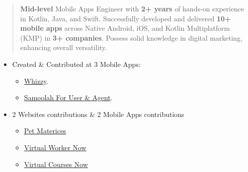 \documentclass[10pt,a4paper,ragged2e,withhyper]{altacv}
\begin{document}

    \makecvheader


    \begin{quote}

        \textbf{Mid-level} Mobile Apps Engineer with \textbf{2+ years} of hands-on experience in Kotlin, Java, and Swift.
        Successfully developed and delivered \textbf{10+ mobile apps} across Native Android, iOS, and Kotlin Multiplatform (KMP) in \textbf{3+ companies}.
        Possess solid knowledge in digital marketing, enhancing overall versatility.

    \end{quote}



    \begin{itemize}
        \item Created \& Contributed at 3 Mobile Apps:
        \begin{itemize}
            \item \hyperlink{whizzy}{Whizzy}.
            \item \hyperlink{samoolah}{Samoolah For User \& Agent}.
        \end{itemize}
    \end{itemize}
    \divider


    \begin{itemize}
        \item 2 Websites contributions \& 2 Mobile Apps contributions
        \begin{itemize}
            \item \hyperlink{pet_materices}{Pet Materices}
            \item \href{https://virtualworkernow.com/} {Virtual Worker Now}
            \item \href{https://virtualcoursesnow.com/vcn-home/} {Virtual Courses Now}
        \end{itemize}
    \end{itemize}
    \divider
\end{document}
